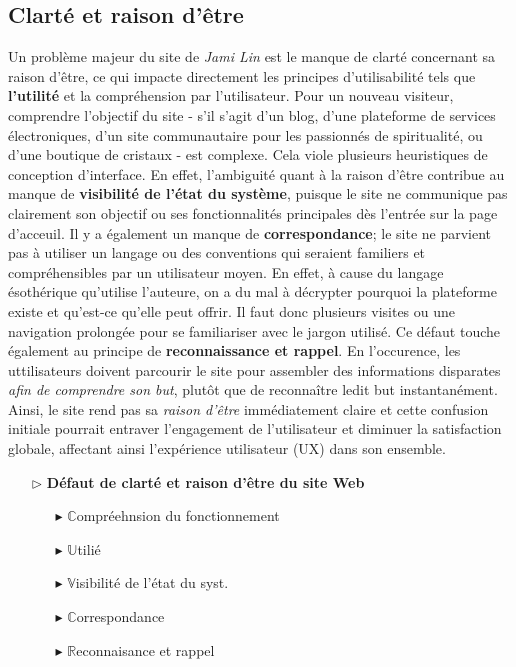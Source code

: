 \documentclass[9pt]{report}
\begin{document}
\begin{multicols*}{2}
  \subsection{Clarté et raison d'être} 
  Un problème majeur du site de \textit{Jami Lin} est le manque de clarté concernant sa 
  raison d'être, ce qui impacte directement les principes d'utilisabilité tels que 
  \textbf{l'utilité} et la compréhension par l'utilisateur. Pour un nouveau visiteur, 
  comprendre l'objectif du site - s'il s'agit d'un blog, d'une plateforme de 
  services électroniques, d'un site communautaire pour les passionnés de spiritualité,
  ou d'une boutique de cristaux - est complexe. Cela viole plusieurs heuristiques 
  de conception d'interface. En effet, l'ambiguité quant à la raison d'être 
  contribue au manque de 
  \textbf{visibilité de l'état du système}, puisque le site ne communique pas 
  clairement son objectif ou ses fonctionnalités principales dès l'entrée sur 
  la page d'acceuil. 
  Il y a également un manque de \textbf{correspondance}; le site ne parvient pas 
  à utiliser un langage ou des conventions qui seraient familiers et compréhensibles 
  par un utilisateur moyen. En effet, à cause du langage ésothérique 
  qu'utilise l'auteure, on a du mal à décrypter pourquoi la plateforme existe 
  et qu'est-ce qu'elle peut offrir. Il faut donc plusieurs visites 
  ou une navigation prolongée pour se familiariser avec le jargon utilisé. Ce défaut 
  touche également au principe de \textbf{reconnaissance et rappel}. En l'occurence, 
  les uttilisateurs doivent parcourir le site pour assembler des informations 
  disparates \textit{afin de comprendre son but}, plutôt que de reconnaître
  ledit but instantanément. Ainsi, le  site rend pas sa \textit{raison d'être} immédiatement 
  claire et cette confusion initiale pourrait entraver l'engagement de 
  l'utilisateur et diminuer la satisfaction globale, affectant ainsi l'expérience 
  utilisateur (UX) dans son ensemble.
  
  \begin{itemize}
    \item [$\rhd$ ] \textbf{Défaut de clarté et raison d'être du site Web}  
      \begin{itemize}
        \item [$\blacktriangleright$ ] $\mathbb{C}$ompréehnsion du fonctionnement  
        \item [$\blacktriangleright$ ] $\mathbb{U}$tilié 
        \item [$\blacktriangleright$ ] $\mathbb{V}$isibilité de l'état du syst.
        \item [$\blacktriangleright$ ] $\mathbb{C}$orrespondance
        \item [$\blacktriangleright$ ] $\mathbb{R}$econnaisance et rappel
      \end{itemize}
  \end{itemize}


\end{multicols*}
\end{document}
